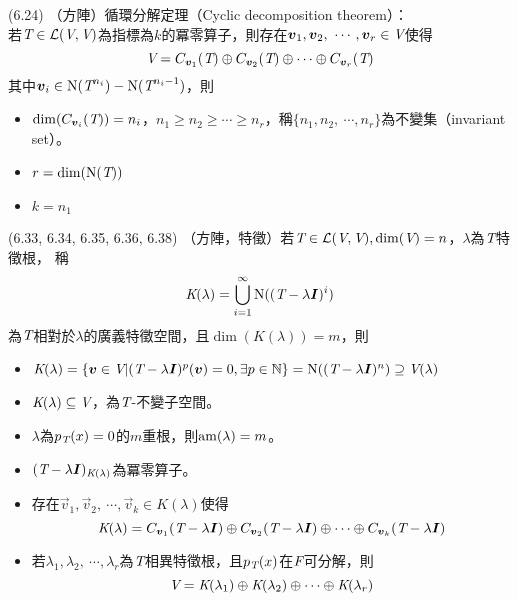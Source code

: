 \item \begin{theorem}{(6.24)} （方陣）循環分解定理（Cyclic decomposition theorem）： \\
	若$\textit{T} \in \mathcal{L}(\textit{V}, \textit{V})$為指標為$k$的冪零算子，則存在$\boldsymbol{v}_1, \boldsymbol{v}_2, \ \cdots, \boldsymbol{v}_r \in \textit{V}$使得
	\begin{equation}
		\textit{V} = C_{\boldsymbol{v}_1}(\textit{T}) \oplus C_{\boldsymbol{v}_2}(\textit{T}) \oplus \cdots \oplus C_{\boldsymbol{v}_r}(\textit{T})
	\end{equation}
	其中$\boldsymbol{v}_i \in \operatorname{N}(\textit{T}^{n_i}) - \operatorname{N}(\textit{T}^{n_i - 1})$，則
	\begin{itemize}
		\item $\dim(C_{\boldsymbol{v}_i}(\textit{T})) = n_i$，$n_1 \ge n_2 \ge \cdots \ge n_r$，稱$\{n_1, n_2, \ \cdots, n_r\}$為不變集（invariant set）。
		\item $r = \dim(\operatorname{N}(\textit{T}))$
		\item $k = n_1$
	\end{itemize}
\end{theorem}

\item \begin{theorem}{(6.33, 6.34, 6.35, 6.36,  6.38)} （方陣，特徵）若$\textit{T} \in \mathcal{L}(\textit{V}, \textit{V}), \dim(\textit{V}) = n$，$\lambda$為$\textit{T}$特徵根，
	稱
	\begin{equation}
		\textit{K}(\lambda) = \bigcup_{i = 1}^{\infty}\operatorname{N}((\textit{T} - \lambda\boldsymbol{I})^i)
	\end{equation}
	為$\textit{T}$相對於$\lambda$的廣義特徵空間，且$\dim(\textit{K}(\lambda)) = m$，則
	\begin{itemize}
		\item $\textit{K}(\lambda) = \{\boldsymbol{v} \in \textit{V} | (\textit{T} - \lambda\boldsymbol{I})^p(\boldsymbol{v}) = 0, \exists p \in \mathbb{N}\} = \operatorname{N}((\textit{T} - \lambda\boldsymbol{I})^n) \supseteq \textit{V}(\lambda)$
		\item $\textit{K}(\lambda) \subseteq \textit{V}$，為$\textit{T}$-不變子空間。
		\item $\lambda$為$p_{\textit{T}}(x) = 0$的$m$重根，則$\operatorname{am}(\lambda) = m$。
		\item $(\textit{T} - \lambda\boldsymbol{I})_{\textit{K}(\lambda)}$為冪零算子。
		\item 存在$\vec{v}_1, \vec{v}_2, \ \cdots, \vec{v}_k \in \textit{K}(\lambda)$使得
		\begin{equation}
			\textit{K}(\lambda) = C_{\boldsymbol{v}_1}(\textit{T} - \lambda\boldsymbol{I}) \oplus C_{\boldsymbol{v}_2}(\textit{T} - \lambda\boldsymbol{I}) \oplus \cdots \oplus C_{\boldsymbol{v}_k}(\textit{T} - \lambda\boldsymbol{I})
		\end{equation}
		\item 若$\lambda_1, \lambda_2, \ \cdots, \lambda_r$為$\textit{T}$相異特徵根，且$p_{\textit{T}}(x)$在$\textit{F}$可分解，則
		\begin{equation}
			\textit{V} = \textit{K}(\lambda_1) \oplus \textit{K}(\lambda_2) \oplus \cdots \oplus \textit{K}(\lambda_r)
		\end{equation}
	\end{itemize}
\end{theorem}

